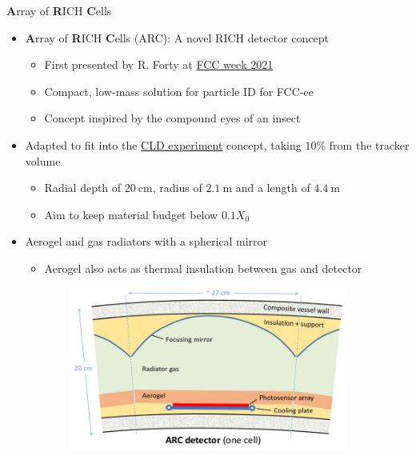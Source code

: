 \documentclass{beamer}
\begin{document}
\begin{frame}{\textbf{A}rray of \textbf{R}ICH \textbf{C}ells}
  \begin{itemize}
    \setlength\itemsep{0.2em}
    \item{\textbf{A}rray of \textbf{R}ICH \textbf{C}ells (ARC): A novel RICH detector concept}
    \begin{itemize}
      \item{First presented by R. Forty at \href{https://indico.cern.ch/event/995850/contributions/4406336/attachments/2274813/3864163/ARC-presentation.pdf}{FCC week 2021}}
      \item{Compact, low-mass solution for particle ID for FCC-ee}
      \item{Concept inspired by the compound eyes of an insect}
    \end{itemize}
    \item{Adapted to fit into the \href{https://arxiv.org/abs/1911.12230}{CLD experiment} concept, taking $10\%$ from the tracker volume}
    \begin{itemize}
      \item{Radial depth of $\SI{20}{\centi\meter}$, radius of $\SI{2.1}{\meter}$ and a length of $\SI{4.4}{\meter}$}
      \item{Aim to keep material budget below $0.1X_0$}
    \end{itemize}
    \item{Aerogel and gas radiators with a spherical mirror}
    \begin{itemize}
      \item{Aerogel also acts as thermal insulation between gas and detector}
    \end{itemize}
  \end{itemize}
  \begin{figure}
    \centering
    \begin{subfigure}{0.4\textwidth}
      \includegraphics[width = 1.0\textwidth]{Plots/ARC_Cell.png}

\end{subfigure}
\end{figure}
\end{frame}
\end{document}
